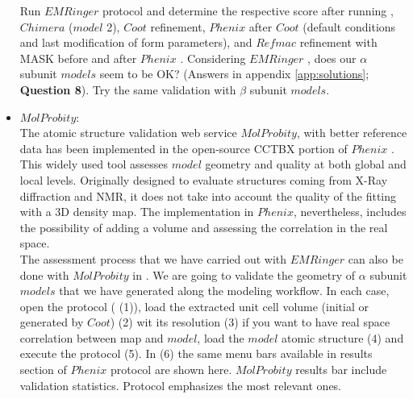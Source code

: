 \begin{itemize}
 Run $EMRinger$ protocol and determine the respective score after running , $Chimera$  ($model$ 2), $Coot$ refinement, $Phenix$  after $Coot$ (default conditions and last modification of form parameters), and $Refmac$ refinement with MASK before and after $Phenix$ . Considering $EMRinger$ , does our  $\alpha$ subunit $models$ seem to be OK? (Answers in appendix \ref{app:solutions}; \textbf{Question 8}). Try the same validation with $\beta$ subunit $models$. \\
 
 \item $MolProbity$:\\
 
 The atomic structure validation web service $MolProbity$, with better reference data has been implemented in the open-source CCTBX portion of $Phenix$ \citep{williams2018}. This widely used tool assesses $model$ geometry and quality at both global and local levels. Originally designed to evaluate structures coming from X-Ray diffraction and NMR, it does not take into account the quality of the fitting with a 3D density map.  The implementation in $Phenix$, nevertheless, includes the possibility of adding a volume and assessing the correlation in the real space.\\
 
 The assessment process that we have carried out with $EMRinger$ can also be done with $MolProbity$ in \scipion. We are going to validate the geometry of  $\alpha$ subunit $models$ that we have generated along the modeling workflow. In each case, open the  protocol ( (1)), load the extracted unit cell volume (initial or generated by $Coot$) (2) wit its resolution (3) if you want to have real space correlation between map and $model$, load the $model$ atomic structure (4) and execute the protocol (5). In  (6) the same menu bars available in results section of $Phenix$  protocol are shown here. $MolProbity$ results bar include validation statistics. Protocol  emphasizes the most relevant ones.\\
 

\end{itemize}
